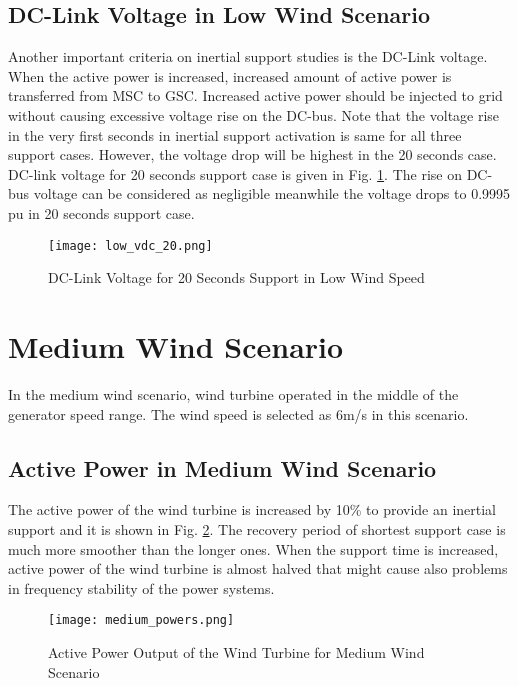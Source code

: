 \subsection{DC-Link Voltage in Low Wind Scenario}
Another important criteria on inertial support studies is the DC-Link voltage. When the active power is increased, increased amount of active power is transferred from MSC to GSC. Increased active power should be injected to grid without causing excessive voltage rise on the DC-bus. Note that the voltage rise in the very first seconds in inertial support activation is same for all three support cases. However, the voltage drop will be highest in the 20 seconds case. DC-link voltage for 20 seconds support case is given in Fig. \ref{low_vdc_s20}. The rise on DC-bus voltage can be considered as negligible meanwhile the voltage drops to 0.9995 pu in 20 seconds support case.
\begin{figure}[h!]
	\centering
	\texttt{[image: low\_vdc\_20.png]}
	\caption{DC-Link Voltage for 20 Seconds Support in Low Wind Speed}
	\label{low_vdc_s20}
\end{figure}
\section{Medium Wind Scenario}
In the medium wind scenario, wind turbine operated in the middle of the generator speed range. The wind speed is selected as 6m/s in this scenario. 
\subsection{Active Power in Medium Wind Scenario}
The active power of the wind turbine is increased by 10\% to provide an inertial support and it is shown in Fig. \ref{midpowers}. The recovery period of shortest support case is much more smoother than the longer ones. When the support time is increased, active power of the wind turbine is almost halved that might cause also problems in frequency stability of the power systems.
\begin{figure}[h!]
	\centering
	\texttt{[image: medium\_powers.png]}
	\caption{Active Power Output of the Wind Turbine for Medium Wind Scenario}
	\label{midpowers}
\end{figure}
